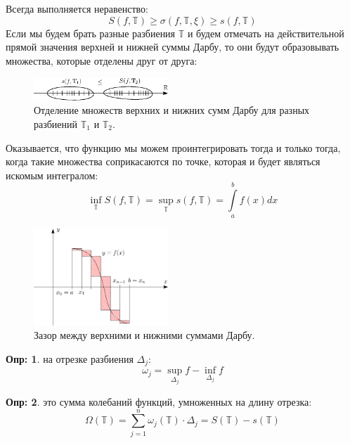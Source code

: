 \documentclass[12pt]{article}
\newcommand{\MTB}{\mathbb{T}}
\theoremstyle{definition}
\newtheorem{defn}{Опр:}
\newcommand{\ddsum}[2]{\displaystyle\sum\limits_{#1}^{#2}}
\newcommand{\ddint}[2]{\displaystyle\int\limits_{#1}^{#2}}
\begin{document}
Всегда выполняется неравенство:
$$
	S(f,\MTB) \geq \sigma(f,\MTB,\xi) \geq s(f,\MTB)
$$
Если мы будем брать разные разбиения $\MTB$ и будем отмечать на действительной прямой значения верхней и нижней суммы Дарбу, то они будут образовывать множества, которые отделены друг от друга:
\begin{figure}[H]
	\centering
	\includegraphics[width=0.45\textwidth]{MA2S8_3.eps}
	\caption{Отделение множеств верхних и нижних сумм Дарбу для разных разбиений $\MTB_1$ и $\MTB_2$.}
	\label{8_3}
\end{figure}
Оказывается, что функцию мы можем проинтегрировать тогда и только тогда, когда такие множества соприкасаются по точке, которая и будет являться искомым интегралом:
$$
	\inf\limits_{\MTB}S(f,\MTB) = \sup\limits_{\MTB}s(f,\MTB) = \ddint{a}{b}f(x)dx
$$
\begin{figure}[H]
	\centering
	\includegraphics[width=0.45\textwidth]{MA2S8_4.png}
	\caption{Зазор между верхними и нижними суммами Дарбу.}
	\label{8_4}
\end{figure}
\begin{defn}
	 на отрезке разбиения $\Delta_j$:
	$$
		\omega_j = \sup\limits_{\Delta_j}f - \inf\limits_{\Delta_j}f
	$$
\end{defn}
\begin{defn}
	 это сумма колебаний функций, умноженных на длину отрезка:
	$$
		\Omega(\MTB) = \ddsum{j=1}{n}\omega_j(\MTB){\cdot}\Delta_j = S(\MTB) - s(\MTB)
	$$
\end{defn}
\end{document}
